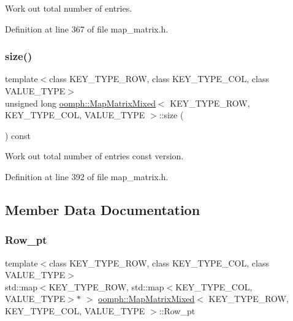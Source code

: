 Work out total number of entries. 



Definition at line 367 of file map\+\_\+matrix.\+h.

\mbox{\label{classoomph_1_1MapMatrixMixed_ae3f2f66dd90a57957c732a9ef1dd5197}} 
\subsubsection{\texorpdfstring{size()}{size()}\hspace{0.1cm}{\footnotesize\ttfamily [2/2]}}
{\footnotesize\ttfamily template$<$class K\+E\+Y\+\_\+\+T\+Y\+P\+E\+\_\+\+R\+OW, class K\+E\+Y\+\_\+\+T\+Y\+P\+E\+\_\+\+C\+OL, class V\+A\+L\+U\+E\+\_\+\+T\+Y\+PE$>$ \\
unsigned long \hyperlink{classoomph_1_1MapMatrixMixed}{oomph\+::\+Map\+Matrix\+Mixed}$<$ K\+E\+Y\+\_\+\+T\+Y\+P\+E\+\_\+\+R\+OW, K\+E\+Y\+\_\+\+T\+Y\+P\+E\+\_\+\+C\+OL, V\+A\+L\+U\+E\+\_\+\+T\+Y\+PE $>$\+::size (\begin{DoxyParamCaption}{ }\end{DoxyParamCaption}) const\hspace{0.3cm}{\ttfamily [inline]}}



Work out total number of entries const version. 



Definition at line 392 of file map\+\_\+matrix.\+h.



\subsection{Member Data Documentation}
\mbox{\label{classoomph_1_1MapMatrixMixed_a1ff123a221da0b158636e28782150e1e}} 
\subsubsection{\texorpdfstring{Row\+\_\+pt}{Row\_pt}}
{\footnotesize\ttfamily template$<$class K\+E\+Y\+\_\+\+T\+Y\+P\+E\+\_\+\+R\+OW, class K\+E\+Y\+\_\+\+T\+Y\+P\+E\+\_\+\+C\+OL, class V\+A\+L\+U\+E\+\_\+\+T\+Y\+PE$>$ \\
std\+::map$<$K\+E\+Y\+\_\+\+T\+Y\+P\+E\+\_\+\+R\+OW, std\+::map$<$K\+E\+Y\+\_\+\+T\+Y\+P\+E\+\_\+\+C\+OL, V\+A\+L\+U\+E\+\_\+\+T\+Y\+PE$>$$\ast$ $>$ \hyperlink{classoomph_1_1MapMatrixMixed}{oomph\+::\+Map\+Matrix\+Mixed}$<$ K\+E\+Y\+\_\+\+T\+Y\+P\+E\+\_\+\+R\+OW, K\+E\+Y\+\_\+\+T\+Y\+P\+E\+\_\+\+C\+OL, V\+A\+L\+U\+E\+\_\+\+T\+Y\+PE $>$\+::Row\+\_\+pt\hspace{0.3cm}{\ttfamily [protected]}}

